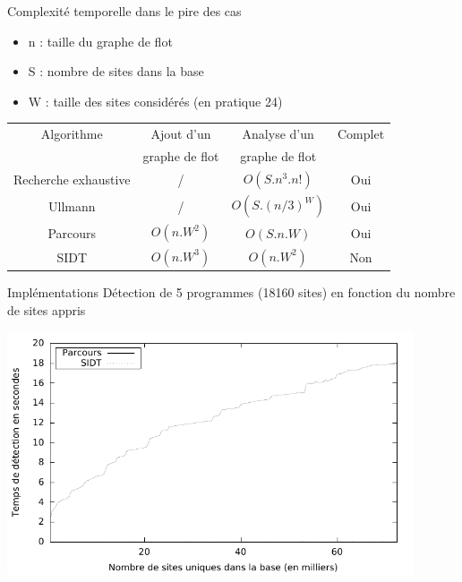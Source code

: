 \documentclass{beamer}
\begin{document}
\begin{frame}{Complexité temporelle dans le pire des cas}
\begin{itemize}
 \item n : taille du graphe de flot
 \item S : nombre de sites dans la base
 \item W : taille des sites considérés (en pratique 24)
\end{itemize}

\begin{center}
\begin{tabular}{|c|c|c|c|}
 \hline
 Algorithme & Ajout d'un & Analyse d'un & Complet\\
   & graphe de flot & graphe de flot & \\
 \hline
 Recherche exhaustive & / & $O(S.n^3.n!)$ & Oui\\
 Ullmann & / & $O(S.(n/3)^W)$ & Oui \\
 Parcours & $O(n.W^2)$ & $O(S.n.W)$ & Oui\\
 SIDT & $O(n.W^3)$ & $O(n.W^2)$ & Non\\
 \hline
\end{tabular} 
\end{center}
\end{frame}

\begin{frame}{Implémentations}
Détection de 5 programmes (18160 sites) en fonction du nombre de sites appris
\begin{center}
\includegraphics[width=0.9\textwidth]{supports/plots/plotScan.pdf}
\end{center}
\end{frame}
\end{document}
